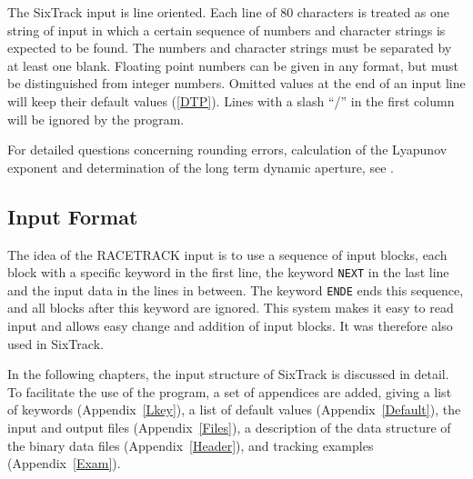 The SixTrack input is line oriented.
Each line of 80 characters is treated as one string of input in which a certain sequence of numbers and character strings is expected to be found.
The numbers and character strings must be separated by at least one blank.
Floating point numbers can be given in any format, but must be distinguished from integer numbers.
Omitted values at the end of an input line will keep their default values (\ref{DTP}).
Lines with a slash ``/'' in the first column will be ignored by the program.

For detailed questions concerning rounding errors, calculation of the Lyapunov exponent and determination of the long term dynamic aperture, see \cite{thesis}.

\subsection{Input Format} \label{sec:informat}

The idea of the RACETRACK input is to use a sequence of input blocks, each block with a specific keyword in the first line, the keyword \texttt{NEXT} in the last line and the input data in the lines in between.
The keyword \texttt{ENDE} ends this sequence, and all blocks after this keyword are ignored.
This system makes it easy to read input and allows easy change and addition of input blocks. It was therefore also used in SixTrack\@.

In the following chapters, the input structure of SixTrack is discussed in detail.
To facilitate the use of the program, a set of appendices are added, giving a list of keywords \mbox{(Appendix~\ref{Lkey}),} a list of default values \mbox{(Appendix~\ref{Default}),} the input and output files \mbox{(Appendix~\ref{Files}),} a description of the data structure of the binary data files \mbox{(Appendix~\ref{Header}),} and tracking examples \mbox{(Appendix~\ref{Exam}).}
